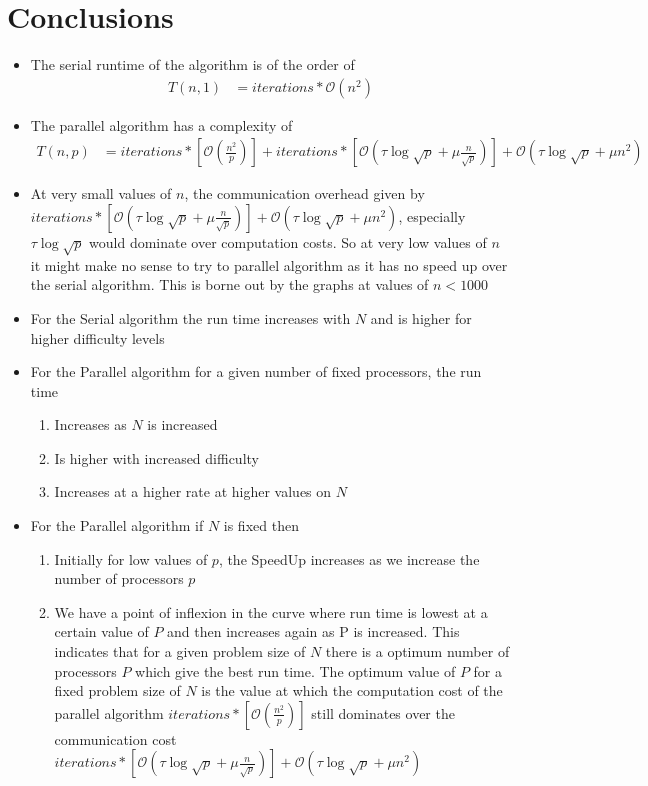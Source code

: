 \documentclass[twoside,11pt]{article}\usepackage{amsmath,amsfonts,amsthm,fullpage}
\begin{document}
\section{Conclusions}
\begin{itemize}
\item
The serial runtime of the algorithm is of the order of
\begin{align}
T(n,1) &= iterations * \mathcal{O}(n^2)\label{p1_runtime_1}
\end{align}
\item
The parallel algorithm has a complexity of
\begin{align}
T(n,p) &= iterations*[\mathcal{O}(\frac{n^2}{p})] + iterations*[\mathcal{O}(\tau \log \sqrt{p} + \mu \frac{n}{\sqrt{p}})] + \mathcal{O}(\tau \log \sqrt{p} + \mu n^2) \label{p1_runtime_2}
\end{align}
\item
At very small values of $n$, the communication overhead given by $iterations*[\mathcal{O}(\tau \log \sqrt{p} + \mu \frac{n}{\sqrt{p}})] + \mathcal{O}(\tau \log \sqrt{p} + \mu n^2)$, especially $\tau \log \sqrt{p}$ would dominate over computation costs. So at very low values of $n$ it might make no sense to try to parallel algorithm as it has no speed up over the serial algorithm. This is borne out by the graphs at values of $n<1000$
\item
For the Serial algorithm the run time increases with $N$ and is higher for higher difficulty levels 
\item
For the Parallel algorithm for a given number of fixed processors, the run time
\begin{enumerate}
\item
Increases as $N$ is increased
\item
Is higher with increased difficulty
\item
Increases at a higher rate at higher values on $N$
\end{enumerate}
\item
For the Parallel algorithm if $N$ is fixed then
\begin{enumerate}
\item
Initially for low values of $p$, the SpeedUp increases as we increase the number of processors $p$
\item
We have a point of inflexion in the curve where run time is lowest at a certain value of $P$ and then increases again as P is increased. This indicates that for a given problem size of $N$ there is a optimum number of processors $P$ which give the best run time. The optimum value of $P$ for a fixed problem size of $N$ is the value at which the computation cost of the parallel algorithm $iterations*[\mathcal{O}(\frac{n^2}{p})]$ still dominates over the communication cost $iterations*[\mathcal{O}(\tau \log \sqrt{p} + \mu \frac{n}{\sqrt{p}})] + \mathcal{O}(\tau \log \sqrt{p} + \mu n^2)$  

\end{enumerate}
\end{itemize}
\end{document}
